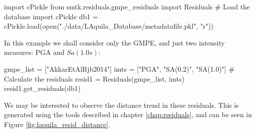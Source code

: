 \begin{python}[frame=single]
import cPickle
from smtk.residuals.gmpe_residuals import Residuals
# Load the database 
import cPickle
db1 = cPickle.load(open("./data/LAquila_Database/metadatafile.pkl",
                        "r"))
\end{python}

In this example we shall consider only the \cite{Akkar_etal2014} GMPE, and just two intensity measures: PGA and $Sa \left( {1.0s} \right)$:

\begin{python}[frame=single]
gmpe_list = ["AkkarEtAlRjb2014"]
imts = ["PGA", "SA(0.2)", "SA(1.0)"]
# Calculate the residuals
resid1 = Residuals(gmpe_list, imts)
resid1.get_residuals(db1)
\end{python}

We may be interested to observe the distance trend in these residuals. This is generated using the tools described in chapter \ref{chap:residuals}, and can be seen in Figure \ref{fig:laquila_resid_distance}.

